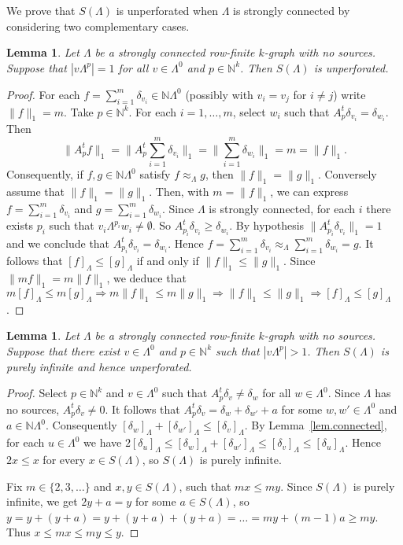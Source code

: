 \documentclass[a4paper, 12pt]{amsart}
\numberwithin{equation}{section}
\newcounter{theorem}
\newtheorem{lemma}[theorem]{Lemma}
\theoremstyle{remark}
\theoremstyle{definition}
\begin{document}
We prove that $S(\Lambda)$ is unperforated when $\Lambda$ is strongly connected by considering two complementary cases.

\begin{lemma}\label{lem.connected.one}
Let $\Lambda$ be a strongly connected row-finite $k$-graph with no sources. Suppose that
$|v\Lambda^p|=1$ for all $v\in \Lambda^0$ and $p\in {\mathbb{N}}^k$. Then $S(\Lambda)$ is
unperforated.
\end{lemma}

\begin{proof}
For each $f=\sum_{i=1}^m\delta_{v_i}\in {\mathbb{N}}\Lambda^0$ (possibly with $v_i=v_j$ for $i\neq
j$) write $\|f\|_1=m$. Take $p\in {\mathbb{N}}^k$. For each $i=1,\dots,m$, select $w_i$ such that
$A^t_p\delta_{v_i}=\delta_{w_i}$. Then
$$\textstyle{\|A^t_pf\|_1=\Big\|A^t_p\sum_{i=1}^m\delta_{v_i}\Big\|_1=\Big\|\sum_{i=1}^m\delta_{w_i}\Big\|_1=m=\|f\|_1.}$$
Consequently, if $f,g\in {\mathbb{N}}\Lambda^0$ satisfy $f\approx_{\Lambda} g$, then
$\|f\|_1=\|g\|_1$. Conversely assume that $\|f\|_1=\|g\|_1$. Then, with $m=\|f\|_1$, we can express $f=\sum_{i=1}^m\delta_{v_i}$ and $g=\sum_{i=1}^m\delta_{w_i}$. Since $\Lambda$ is
strongly connected, for each $i$ there exists $p_i$ such that $v_i\Lambda^{p_i}w_i\neq
\emptyset$. So $A^t_{p_i} \delta_{v_i}\geq \delta_{w_i}$. By hypothesis
$\|A^t_{p_i}\delta_{v_i}\|_1=1$ and we conclude that $A^t_{p_i}\delta_{v_i}=\delta_{w_i}$. Hence
$f=\sum_{i=1}^m\delta_{v_i}\approx_{\Lambda} \sum_{i=1}^m\delta_{w_i}=g$. It
follows that ${{[{f}]_\Lambda}}\leq {{[{g}]_\Lambda}}$ if and only if $\|f\|_1\leq \|g\|_1$. Since
$\|mf\|_1=m\|f\|_1$, we deduce that $m{{[{f}]_\Lambda}}\leq m{{[{g}]_\Lambda}}\Rightarrow m\|f\|_1\leq
m\|g\|_1\Rightarrow \|f\|_1\leq \|g\|_1\Rightarrow {{[{f}]_\Lambda}}\leq {{[{g}]_\Lambda}}$.
\end{proof}

\begin{lemma}\label{lem.connected.two}
Let $\Lambda$ be a strongly connected row-finite $k$-graph with no sources. Suppose that there
exist $v\in \Lambda^0$ and $p\in {\mathbb{N}}^k$ such that $|v\Lambda^p|>1$. Then $S(\Lambda)$ is
purely infinite and hence unperforated.
\end{lemma}
\begin{proof}
Select $p\in {\mathbb{N}}^k$ and $v\in \Lambda^0$ such that $A^t_p\delta_v \neq \delta_w$ for all
$w\in \Lambda^0$. Since $\Lambda$ has no sources, $A^t_p \delta_v\neq 0$. It follows that
$A^t_p\delta_v = \delta_w+\delta_{w'}+a$ for some $w,w'\in\Lambda^0$ and $a\in
{\mathbb{N}}\Lambda^0$. Consequently ${{[{\delta_w}]_\Lambda}}+{{[{\delta_{w'}}]_\Lambda}}\leq {{[{\delta_v}]_\Lambda}}$.
By Lemma~\ref{lem.connected}, for each $u\in \Lambda^0$ we have $2{{[{\delta_u}]_\Lambda}}\leq
{{[{\delta_w}]_\Lambda}}+{{[{\delta_{w'}}]_\Lambda}}\leq {{[{\delta_v}]_\Lambda}}\leq {{[{\delta_u}]_\Lambda}}$. Hence
$2x\leq x$ for every $x\in S(\Lambda)$, so $S(\Lambda)$ is purely infinite.

Fix $m\in \{2,3, \dots\}$ and $x,y\in S(\Lambda)$, such that $mx\leq my$. Since
$S(\Lambda)$ is purely infinite, we get $2y+a=y$ for some $a\in S(\Lambda)$, so
$y=y+(y+a)=y+(y+a)+(y+a)=\dots=my + (m-1)a\geq my$. Thus $x\leq mx\leq my\leq y$.
\end{proof}
\end{document}
